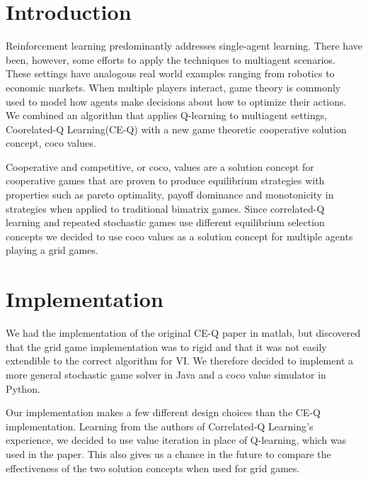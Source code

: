 
\section{Introduction}
\nocite{*}

\hspace{5mm}Reinforcement learning predominantly addresses single-agent learning. There have been, however, some efforts to apply the techniques to multiagent scenarios. These settings have analogous real world examples ranging from robotics to economic markets. When multiple players interact, game theory is commonly used to model how agents make decisions about how to optimize their actions. We combined an algorithm that applies Q-learning to multiagent settings, Coorelated-Q Learning\cite{Greenwald03correlated-qlearning}(CE-Q) with a new game theoretic cooperative solution concept, coco values\cite{Kalai_acooperative}.

Cooperative and competitive, or coco, values \cite{Kalai:2011:CTP:1978721.1978725, Kalai:2010:CCS:1807342.1807397, Kalai_acooperative} are a solution concept for cooperative games that are proven to produce equilibrium strategies with properties such as pareto optimality, payoff dominance and monotonicity in strategies when applied to traditional bimatrix games. Since correlated-Q learning\cite{Greenwald03correlated-qlearning} and repeated stochastic games\cite{DBLP:journals/corr/abs-1206-3277} use different equilibrium selection concepts we decided to use coco values as a solution concept for multiple agents playing a grid games. 

\section{Implementation}
\hspace{5mm}We had the implementation of the original CE-Q paper in matlab, but discovered that the grid game implementation was to rigid and that it was not easily extendible to the correct algorithm for VI. We therefore decided to implement a more general stochastic game solver in Java and a coco value simulator in Python. 

\hspace{5mm}Our implementation makes a few different design choices than the CE-Q implementation. Learning from the authors of Correlated-Q Learning's experience, we decided to use value iteration in place of Q-learning, which was used in the paper. This also gives us a chance in the future to compare the effectiveness of the two solution concepts when used for grid games.

